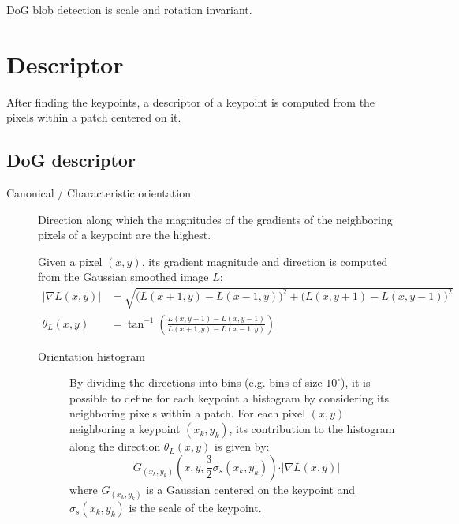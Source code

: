 \begin{remark}
    DoG blob detection is scale and rotation invariant.
\end{remark}



\section{Descriptor}

After finding the keypoints, a descriptor of a keypoint is computed from the pixels within a patch centered on it.


\subsection{DoG descriptor}

\begin{description}
    \item[Canonical / Characteristic orientation] 
        Direction along which the magnitudes of the gradients of the neighboring pixels of a keypoint are the highest.

        Given a pixel $(x, y)$, its gradient magnitude and direction is computed from the Gaussian smoothed image $L$:
        \[ 
            \begin{split}
                \vert \nabla L(x, y) \vert &= \sqrt{ \big( L(x+1, y) - L(x-1, y) \big)^2 + \big( L(x, y+1) - L(x, y-1) \big)^2 } \\
                \theta_L(x, y) &= \tan^{-1}\left( \frac{L(x, y+1) - L(x, y-1)}{L(x+1, y) - L(x-1, y)} \right)
            \end{split}
        \] 

        \begin{description}
            \item[Orientation histogram] 
                By dividing the directions into bins (e.g. bins of size $10^\circ$),
                it is possible to define for each keypoint a histogram by considering its neighboring pixels within a patch.
                For each pixel $(x, y)$ neighboring a keypoint $(x_k, y_k)$, its contribution to the histogram along the direction $\theta_L(x, y)$ is given by:
                \[ G_{(x_k, y_k)}(x, y, \frac{3}{2} \sigma_s(x_k, y_k)) \cdot \vert \nabla L(x, y) \vert \]
                where $G_{(x_k, y_k)}$ is a Gaussian centered on the keypoint and  $\sigma_s(x_k, y_k)$ is the scale of the keypoint.


\end{description}
\end{description}
